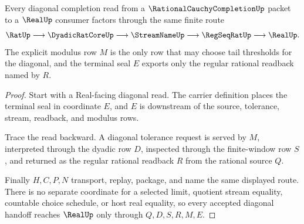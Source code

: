 \begin{theorem}
\label{thm:rational-cauchy-completion-diagonal-seal-handoff}
Every diagonal completion read from a $\RationalCauchyCompletionUp$ packet to a $\RealUp$ consumer factors through the same finite route
$$
\RatUp \longrightarrow \DyadicRatCoreUp \longrightarrow \StreamNameUp \longrightarrow \RegSeqRatUp \longrightarrow \RealUp .
$$
The explicit modulus row $M$ is the only row that may choose tail thresholds for the diagonal, and the terminal seal $E$ exports only the regular rational readback named by $R$.
\end{theorem}
\begin{proof}
Start with a Real-facing diagonal read. The carrier definition places the terminal seal in coordinate $E$, and $E$ is downstream of the source, tolerance, stream, readback, and modulus rows.

Trace the read backward. A diagonal tolerance request is served by $M$, interpreted through the dyadic row $D$, inspected through the finite-window row $S$, and returned as the regular rational readback $R$ from the rational source $Q$.

Finally $H,C,P,N$ transport, replay, package, and name the same displayed route. There is no separate coordinate for a selected limit, quotient stream equality, countable choice schedule, or host real equality, so every accepted diagonal handoff reaches $\RealUp$ only through $Q,D,S,R,M,E$.
\end{proof}




